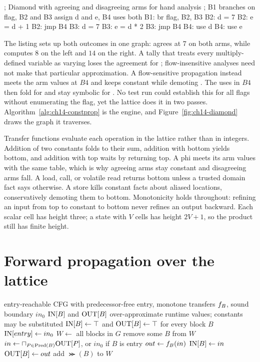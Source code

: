 \begin{irlisting}
; Diamond with agreeing and disagreeing arms for hand analysis
; B1 branches on flag, B2 and B3 assign d and e, B4 uses both
B1: br flag, B2, B3
B2: d = 7
B2: e = d + 1
B2: jmp B4
B3: d = 7
B3: e = d * 2
B3: jmp B4
B4: use d
B4: use e
\end{irlisting}

The listing sets up both outcomes in one graph:  agrees at $7$ on both arms, while  computes $8$ on the left and $14$ on the right.
A tally that treats every multiply-defined variable as varying loses the agreement for ; flow-insensitive analyses need not make that particular approximation.
A flow-sensitive propagation instead meets the arm values at $B4$ and keeps  constant while demoting .
The uses in $B4$ then fold for  and stay symbolic for .
No test run could establish this for all flags without enumerating the flag, yet the lattice does it in two passes.
Algorithm~\ref{alg:ch14-constprop} is the engine, and Figure~\ref{fig:ch14-diamond} draws the graph it traverses.

Transfer functions evaluate each operation in the lattice rather than in integers.
Addition of two constants folds to their sum, addition with bottom yields bottom, and addition with top waits by returning top.
A phi meets its arm values with the same table, which is why agreeing arms stay constant and disagreeing arms fall.
A load, call, or volatile read returns bottom unless a trusted domain fact says otherwise.
A store kills constant facts about aliased locations, conservatively demoting them to bottom.
Monotonicity holds throughout: refining an input from top to constant to bottom never refines an output backward.
Each scalar cell has height three; a state with $V$ cells has height $2V+1$, so the product still has finite height.
\section{Forward propagation over the lattice}
\label{sec:ch14-algorithm}

\begin{algorithm}
\caption{Forward constant propagation on the flat lattice}\label{alg:ch14-constprop}
\begin{pseudocode}
\Require entry-reachable CFG with predecessor-free entry, monotone transfers $f_{B}$, sound boundary $in_0$
\Ensure $\mathrm{IN}[B]$ and $\mathrm{OUT}[B]$ over-approximate runtime values; constants may be substituted
\State $\mathrm{IN}[B] \gets \top$ and $\mathrm{OUT}[B] \gets \top$ for every block $B$
\State $\mathrm{IN}[entry] \gets in_0$
\State $W \gets$ all blocks in $G$
\State remove some $B$ from $W$
\State $in \gets \sqcap_{P \in \operatorname{Pred}(B)} \mathrm{OUT}[P]$, or $in_0$ if $B$ is entry
\State $out \gets f_{B}(in)$
\State $\mathrm{IN}[B] \gets in$
\State $\mathrm{OUT}[B] \gets out$
\State add $\Succ(B)$ to $W$
\EndIf
\EndWhile
\end{pseudocode}
\end{algorithm}

